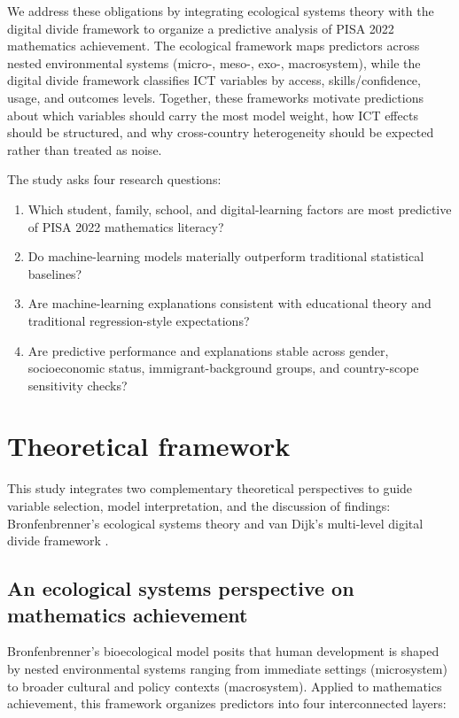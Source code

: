 \documentclass[pdflatex,sn-mathphys-ay]{sn-jnl}
\begin{document}
We address these obligations by integrating ecological systems theory \citep{Bronfenbrenner_1979} with the digital divide framework to organize a predictive analysis of PISA 2022 mathematics achievement. The ecological framework maps predictors across nested environmental systems (micro-, meso-, exo-, macrosystem), while the digital divide framework classifies ICT variables by access, skills/confidence, usage, and outcomes levels. Together, these frameworks motivate predictions about which variables should carry the most model weight, how ICT effects should be structured, and why cross-country heterogeneity should be expected rather than treated as noise.

The study asks four research questions:

\begin{enumerate}
\item Which student, family, school, and digital-learning factors are most predictive of PISA 2022 mathematics literacy?
\item Do machine-learning models materially outperform traditional statistical baselines?
\item Are machine-learning explanations consistent with educational theory and traditional regression-style expectations?
\item Are predictive performance and explanations stable across gender, socioeconomic status, immigrant-background groups, and country-scope sensitivity checks?
\end{enumerate}

\section{Theoretical framework}

This study integrates two complementary theoretical perspectives to guide variable selection, model interpretation, and the discussion of findings: Bronfenbrenner's ecological systems theory \citep{Bronfenbrenner_1979,Bronfenbrenner_1994} and van Dijk's multi-level digital divide framework \citep{van_Dijk_2005,van_Dijk_2020}.

\FloatBarrier
\subsection{An ecological systems perspective on mathematics achievement}

Bronfenbrenner's bioecological model posits that human development is shaped by nested environmental systems ranging from immediate settings (microsystem) to broader cultural and policy contexts (macrosystem). Applied to mathematics achievement, this framework organizes predictors into four interconnected layers:
\end{document}
